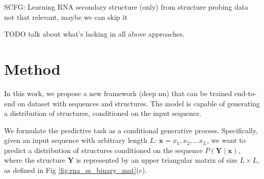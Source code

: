 \documentclass{article}
\begin{document}




SCFG: ﻿Learning RNA secondary structure (only) from structure probing data
not that relevant, maybe we can skip it

TODO talk about what's lacking in all above approaches.


%
%
%
%


\section{Method}


In this work, we propose a new framework (deep nn) that can be trained end-to-end on dataset with sequences and structures.
The model is capable of generating a distribution of structures, conditioned on the input sequence.

We formulate the predictive task as a conditional generative process.
Specifically, given an input sequence with arbitrary length $L$: $\bm{x} = x_1, x_2, \dots x_{L}$,
we want to predict a distribution of structures conditioned on the sequence $P(\bm{Y} \mid \bm{x})$,
where the structure $\bm{Y}$ is represented by an upper triangular matrix of size $L \times L$, as defined in Fig \ref{fig:rna_ss_binary_mat}(c).
\end{document}
